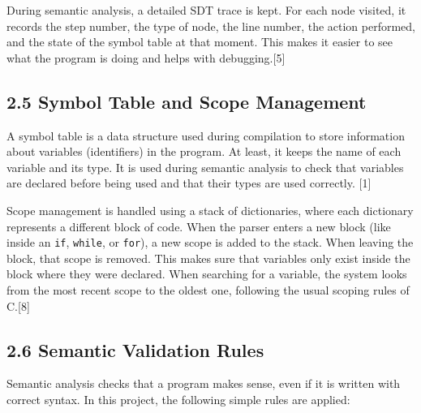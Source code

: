 \documentclass[letterpaper,12pt,oneside]{article}
\begin{document}
During semantic analysis, a detailed SDT trace is kept. For each node visited, it records the step number, the type of node, the line number, the action performed, and the state of the symbol table at that moment. This makes it easier to see what the program is doing and helps with debugging.[5]

\subsection*{2.5 Symbol Table and Scope Management}

A symbol table is a data structure used during compilation to store information about variables (identifiers) in the program. At least, it keeps the name of each variable and its type. It is used during semantic analysis to check that variables are declared before being used and that their types are used correctly. [1]

Scope management is handled using a stack of dictionaries, where each dictionary represents a different block of code. When the parser enters a new block (like inside an \texttt{if}, \texttt{while}, or \texttt{for}), a new scope is added to the stack. When leaving the block, that scope is removed. This makes sure that variables only exist inside the block where they were declared. When searching for a variable, the system looks from the most recent scope to the oldest one, following the usual scoping rules of C.[8]

\subsection*{2.6 Semantic Validation Rules}

Semantic analysis checks that a program makes sense, even if it is written with correct syntax. In this project, the following simple rules are applied:
\end{document}
